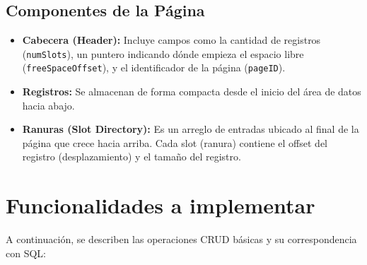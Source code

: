 \documentclass[12pt,a4paper]{article}
\begin{document}
\subsection*{Componentes de la Página}
\begin{itemize}
    \item \textbf{Cabecera (Header):} Incluye campos como la cantidad de registros (\texttt{numSlots}), un puntero indicando dónde empieza el espacio libre (\texttt{freeSpaceOffset}), y el identificador de la página (\texttt{pageID}).
    \item \textbf{Registros:} Se almacenan de forma compacta desde el inicio del área de datos hacia abajo.
    \item \textbf{Ranuras (Slot Directory):} Es un arreglo de entradas ubicado al final de la página que crece hacia arriba. Cada slot (ranura) contiene el offset del registro (desplazamiento) y el tamaño del registro.
\end{itemize}

\section{Funcionalidades a implementar}

A continuación, se describen las operaciones CRUD básicas y su correspondencia con SQL:
\end{document}
